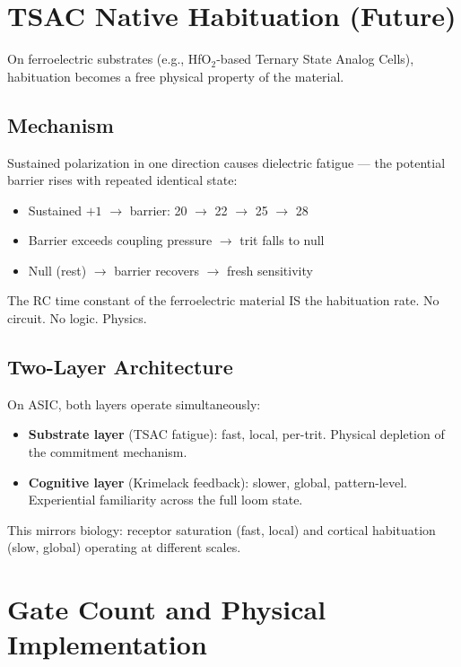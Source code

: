 \documentclass[11pt, a4paper]{article}
\begin{document}
\section{TSAC Native Habituation (Future)}

On ferroelectric substrates (e.g., HfO$_2$-based Ternary
State Analog Cells), habituation becomes a free physical
property of the material.

\subsection{Mechanism}

Sustained polarization in one direction causes dielectric
fatigue --- the potential barrier rises with repeated identical
state:
\begin{itemize}[nosep]
  \item Sustained $+1$ $\to$ barrier: 20 $\to$ 22 $\to$ 25
        $\to$ 28
  \item Barrier exceeds coupling pressure $\to$ trit falls to null
  \item Null (rest) $\to$ barrier recovers $\to$ fresh sensitivity
\end{itemize}

The RC time constant of the ferroelectric material IS the
habituation rate. No circuit. No logic. Physics.

\subsection{Two-Layer Architecture}

On ASIC, both layers operate simultaneously:
\begin{itemize}[nosep]
  \item \textbf{Substrate layer} (TSAC fatigue): fast, local,
        per-trit. Physical depletion of the commitment mechanism.
  \item \textbf{Cognitive layer} (Krimelack feedback): slower,
        global, pattern-level. Experiential familiarity across
        the full loom state.
\end{itemize}

This mirrors biology: receptor saturation (fast, local) and
cortical habituation (slow, global) operating at different
scales.

\section{Gate Count and Physical Implementation}
\end{document}
